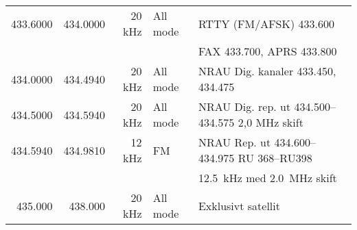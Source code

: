 \begin{tabular}{rrrll}
	         433.6000 & 434.0000 & 20 kHz  & All mode     & RTTY (FM/AFSK) \num{433,600}                                 \\
	                  &          &         &              & FAX \num{433,700}, APRS \num{433,800}                        \\ \hline
	         434.0000 & 434.4940 & 20 kHz  & All mode     & NRAU Dig. kanaler \num{433,450}, \num{434,475}               \\ \hline
	         434.5000 & 434.5940 & 20 kHz  & All mode     & NRAU Dig. rep. ut \numrange{434,500}{434,575} 2,0 MHz skift  \\ \hline
	         434.5940 & 434.9810 & 12 kHz  & FM           & NRAU Rep. ut \numrange{434,600}{434,975} RU 368--RU398       \\
	                  &          &         &              & \SI{12,5}{kHz} med \SI{2,0}{MHz} skift                       \\ \hline
	          435.000 & 438.000  & 20 kHz  & All mode     & Exklusivt satellit
\end{tabular}

